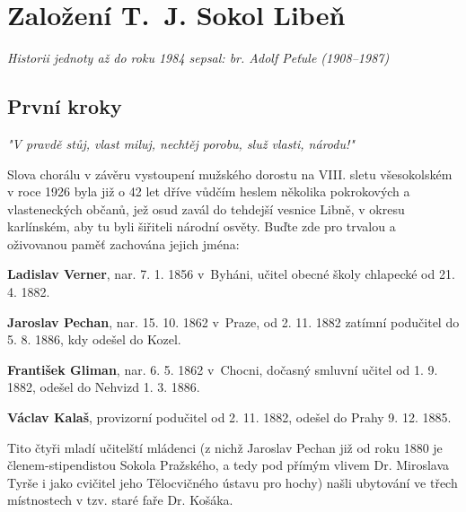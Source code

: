 \documentclass[a5paper, 11pt, twoside]{article}
\begin{document}
\clearpage

\section{Založení T.~J. Sokol Libeň}
\vspace{\baselineskip}

\textit{Historii jednoty až do roku 1984 sepsal: br. Adolf Peťule (1908–1987)}

\subsection{První kroky}

\begin{center}
  \textit{"V pravdě stůj, vlast miluj, nechtěj porobu, služ vlasti, národu!"}
\end{center}
\noindent Slova chorálu v závěru vystoupení mužského dorostu na VIII. sletu
všesokolském v roce 1926 byla již o 42 let dříve vůdčím heslem několika
pokrokových a vlasteneckých občanů, jež osud zavál do tehdejší vesnice
Libně, v okresu karlínském, aby tu byli šiřiteli národní osvěty. Buďte
zde pro trvalou a oživovanou paměť zachována jejich jména:

\textbf{Ladislav Verner}, nar. 7. 1. 1856 v~Byháni, učitel obecné školy chlapecké od 21. 4. 1882.

\textbf{Jaroslav Pechan}, nar. 15. 10. 1862 v~Praze, od 2. 11. 1882 zatímní podučitel do 5. 8. 1886, kdy odešel do Kozel.

\textbf{František Gliman}, nar. 6. 5. 1862 v~Chocni, dočasný smluvní učitel od 1. 9. 1882, odešel do Nehvizd 1. 3. 1886.

\textbf{Václav Kalaš}, provizorní podučitel od 2. 11. 1882, odešel do Prahy 9. 12. 1885.

Tito čtyři mladí učitelští mládenci (z nichž Jaroslav Pechan již od roku
1880 je členem-stipendistou Sokola Pražského, a tedy pod přímým vlivem
Dr. Miroslava Tyrše i jako cvičitel jeho Tělocvičného ústavu pro hochy)
našli ubytování ve třech místnostech v tzv. staré faře Dr. Košáka.
\end{document}
